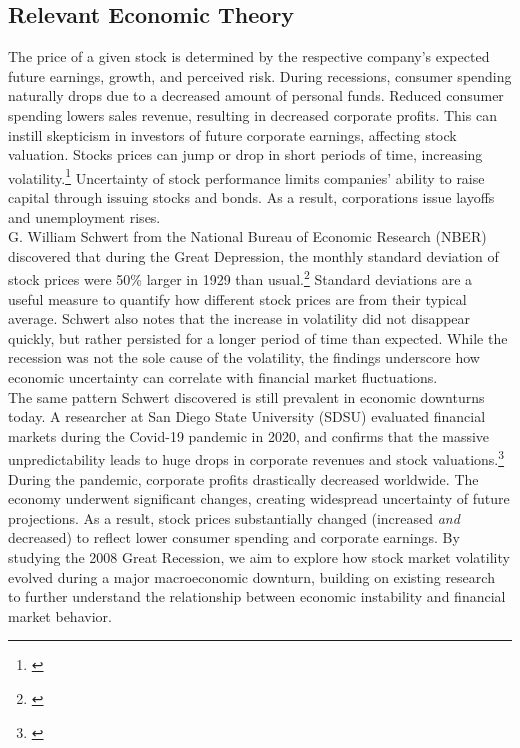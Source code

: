 \subsection{Relevant Economic Theory}
\indent The price of a given stock is determined by the respective company's expected future earnings, growth, and perceived risk. During recessions, consumer spending naturally drops due to a decreased amount of personal funds. Reduced consumer spending lowers sales revenue, resulting in decreased corporate profits. This can instill skepticism in investors of future corporate earnings, affecting stock valuation. Stocks prices can jump or drop in short periods of time, increasing volatility.\footnote{\cite{Fidelity}} Uncertainty of stock performance limits companies' ability to raise capital through issuing stocks and bonds. As a result, corporations issue layoffs and unemployment rises. \\
\indent G. William Schwert from the National Bureau of Economic Research (NBER) discovered that during the Great Depression, the monthly standard deviation of stock prices were 50\% larger in 1929 than usual.\footnote{\cite{NBER}} Standard deviations are a useful measure to quantify how different stock prices are from their typical average. Schwert also notes that the increase in volatility did not disappear quickly, but rather persisted for a longer period of time than expected. While the recession was not the sole cause of the volatility, the findings underscore how economic uncertainty can correlate with financial market fluctuations. \\
\indent The same pattern Schwert discovered is still prevalent in economic downturns today. A researcher at San Diego State University (SDSU) evaluated financial markets during the Covid-19 pandemic in 2020, and confirms that the massive unpredictability leads to huge drops in corporate revenues and stock valuations.\footnote{\cite{sdsu2020volatile}} During the pandemic, corporate profits drastically decreased worldwide. The economy underwent significant changes, creating widespread uncertainty of future projections. As a result, stock prices substantially changed (increased \textit{and} decreased) to reflect lower consumer spending and corporate earnings. By studying the 2008 Great Recession, we aim to explore how stock market volatility evolved during a major macroeconomic downturn, building on existing research to further understand the relationship between economic instability and financial market behavior.
